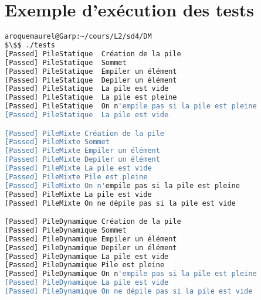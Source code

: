 \documentclass[a4paper, 11pt]{article}
\begin{document}
\section{Exemple d'exécution des tests}
\begin{lstlisting}[language=sh, basicstyle=\scriptsize\ttfamily, caption=Exemple d'execution des tests]
aroquemaurel@Garp:~/cours/L2/sd4/DM
$\$$ ./tests
[Passed] PileStatique  Création de la pile
[Passed] PileStatique  Sommet
[Passed] PileStatique  Empiler un élément
[Passed] PileStatique  Depiler un élément
[Passed] PileStatique  La pile est vide
[Passed] PileStatique  La pile est pleine
[Passed] PileStatique  On n'empile pas si la pile est pleine
[Passed] PileStatique  La pile est vide

[Passed] PileMixte Création de la pile
[Passed] PileMixte Sommet
[Passed] PileMixte Empiler un élément
[Passed] PileMixte Depiler un élément
[Passed] PileMixte La pile est vide
[Passed] PileMixte Pile est pleine
[Passed] PileMixte On n'empile pas si la pile est pleine
[Passed] PileMixte La pile est vide
[Passed] PileMixte On ne dépile pas si la pile est vide

[Passed] PileDynamique Création de la pile
[Passed] PileDynamique Sommet
[Passed] PileDynamique Empiler un élément
[Passed] PileDynamique Depiler un élément
[Passed] PileDynamique La pile est vide
[Passed] PileDynamique Pile est pleine
[Passed] PileDynamique On n'empile pas si la pile est pleine
[Passed] PileDynamique La pile est vide
[Passed] PileDynamique On ne dépile pas si la pile est vide
\end{lstlisting}
\end{document}
